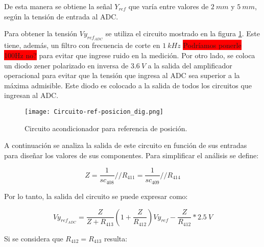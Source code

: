 De esta manera se obtiene la señal $Y_{ref}$ que varía entre valores de $2\:mm$ y $5\:mm$, según la tensión de entrada al ADC.

Para obtener la tensión $Vy_{ref_{ADC}}$ se utiliza el circuito mostrado en la figura \ref{fig:circuito-ref-posicion}. Este tiene, además, un filtro con frecuencia de corte en $1\:kHz$ \colorbox{red}{Podríamos ponerle 100Hz no?} para evitar que ingrese ruido en la medición. Por otro lado, se coloca un diodo zener polarizado en inversa de $3.6\:V$ a la salida del amplificador operacional para evitar que la tensión que ingresa al ADC sea superior a la máxima admisible. Este diodo es colocado a la salida de todos los circuitos que ingresan al ADC.


\begin{figure}[H]
	\centering
	\texttt{[image: Circuito-ref-posicion\_dig.png]}
	\caption{Circuito acondicionador para referencia de posición.}
	\label{fig:circuito-ref-posicion}
\end{figure}

%
%  
%  
 
A continuación se analiza la salida de este circuito en función de sus entradas para diseñar los valores de sus componentes. Para simplificar el análisis se define:

\begin{equation*} 
	Z=\frac{1}{sc_{408}}//R_{411}=\frac{1}{sc_{409}}//R_{414}
\end{equation*}

Por lo tanto, la salida del circuito se puede expresar como:

\begin{equation*} 
	Vy_{ref_{ADC}}=\frac{Z}{Z+R_{413}}(1+\frac{Z}{R_{412}})Vy_{ref}-\frac{Z}{R_{412}}*2.5\:V
\end{equation*}

Si se considera que $R_{412}=R_{413}$ resulta:

